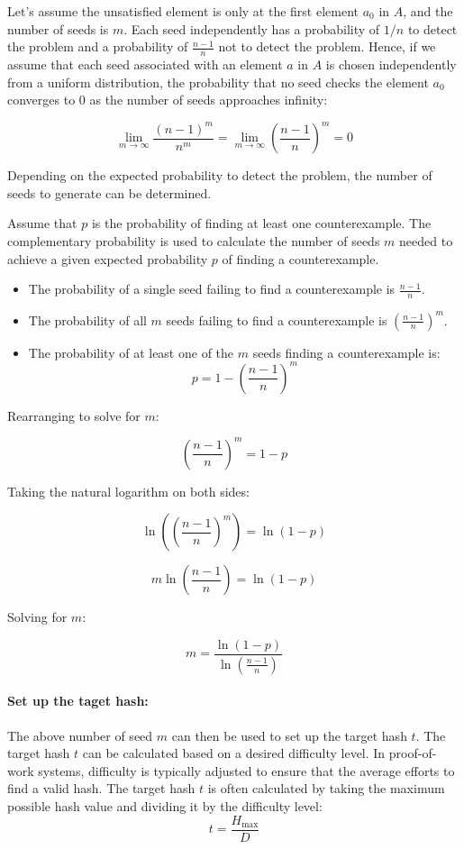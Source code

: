 \documentclass[runningheads]{llncs}
\begin{document}
Let's assume the unsatisfied element is only at the first element $a_0$ in $A$, and the number of seeds is $m$. Each seed independently has a probability of $1/n$ to detect the problem and a probability of $\frac{n-1}{n}$ not to detect the problem. Hence, if we assume that each seed associated with an element $a$ in $A$ is chosen independently from a uniform distribution, the probability that no seed checks the element $a_0$ converges to $0$ as the number of seeds approaches infinity:

\[
  \lim_{m \to \infty} \frac{(n-1)^m}{n^m} = \lim_{m \to \infty} \left( \frac{n-1}{n} \right)^m = 0
\]

Depending on the expected probability to detect the problem, the number of seeds to generate can be determined. 

Assume that $p$ is the probability of finding at least one counterexample. The complementary probability is used to calculate the number of seeds $m$ needed to achieve a given expected probability $p$ of finding a counterexample.
\begin{itemize}
\item The probability of a single seed failing to find a counterexample is $\frac{n-1}{n}$.
\item The probability of all $m$ seeds failing to find a counterexample is $\left(\frac{n-1}{n}\right)^m$.
\item The probability of at least one of the $m$ seeds finding a counterexample is:
\[
p = 1 - \left(\frac{n-1}{n}\right)^m
\]
\end{itemize}  

Rearranging to solve for \( m \):

\[
\left(\frac{n-1}{n}\right)^m = 1 - p
\]

Taking the natural logarithm on both sides:

\[
\ln\left(\left(\frac{n-1}{n}\right)^m\right) = \ln(1 - p)
\]

\[
m \ln\left(\frac{n-1}{n}\right) = \ln(1 - p)
\]

Solving for \( m \):

\[
m = \frac{\ln(1 - p)}{\ln\left(\frac{n-1}{n}\right)}
\]

\paragraph{Set up the taget hash:}
The above number of seed $m$ can then be used to set up the target hash $t$. The target hash $t$ can be calculated based on a desired difficulty level. In proof-of-work systems, difficulty is typically adjusted to ensure that the average efforts to find a valid hash. The target hash $t$ is often calculated by taking the maximum possible hash value and dividing it by the difficulty level:
\[
t = \frac{H_{\text{max}}}{D}
\]
\end{document}
